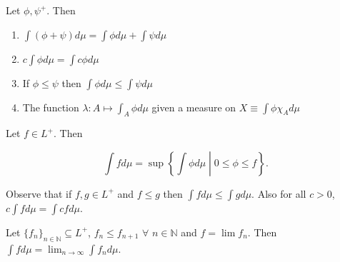 \documentclass{functionspaces}
\begin{document}
\begin{proposition}
Let $\phi,\psi^{+}.$ Then

\begin{enumerate}
    \item $\int (\phi+\psi)d\mu = \int \phi d\mu + \int \psi d\mu$
    
    \item $c \int \phi d\mu = \int c\phi d\mu$
    
    \item If $\phi \leq \psi$ then $\int \phi d\mu \leq \int \psi d\mu$
    
    \item The function $\lambda:A \mapsto \int_{A} \phi d\mu$ given a measure on $X \equiv \int \phi \chi_{A} d\mu$
\end{enumerate}
\end{proposition}

\begin{definition}
Let $f \in L^{+}.$ Then

\[
\int f d\mu = \sup\left\{\int \phi d\mu \middle| 0 \leq \phi \leq f\right\}.
\]

Observe that if $f,g \in L^{+}$ and $f \leq g$ then $\int f d\mu \leq \int g d\mu.$ Also for all $c > 0$, $c \int f d\mu = \int c f d\mu.$
\end{definition}

\begin{theorem}
Let $\{f_{n}\}_{n \in \mathbb{N}} \subseteq L^{+}$, $f_{n} \leq f_{n+1}$ $\forall$ $n \in \mathbb{N}$ and $f = \lim f_{n}.$ Then $\int f d\mu = \lim_{n \rightarrow \infty} \int f_{n} d\mu.$
\end{theorem}
\end{document}
